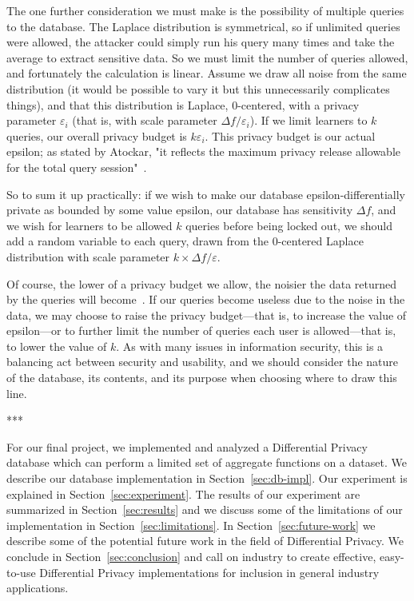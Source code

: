 \documentclass[conference,11pt]{IEEEtran}
\begin{document}
The one further consideration we must make is the possibility of multiple
queries to the database. The Laplace distribution is symmetrical, so if
unlimited queries were allowed, the attacker could simply run his query many
times and take the average to extract sensitive data. So we must limit the
number of queries allowed, and fortunately the calculation is linear. Assume we
draw all noise from the same distribution (it would be possible to vary it but
this unnecessarily complicates things), and that this distribution is Laplace,
0-centered, with a privacy parameter $\varepsilon_i$ (that is, with scale
parameter ${\Delta}f/\varepsilon_i$). If we limit learners to $k$ queries, our
overall privacy budget is $k\varepsilon_i$. This privacy budget is our
actual epsilon; as stated by Atockar, "it reflects the maximum privacy release
allowable for the total query session"~\cite{Atockar:2014}.

So to sum it up practically: if we wish to make our database
epsilon-differentially private as bounded by some value epsilon, our database
has sensitivity ${\Delta}f$, and we wish for learners to be allowed $k$ queries
before being locked out, we should add a random variable to each query, drawn
from the 0-centered Laplace distribution with scale parameter $k \times
{\Delta}f/\varepsilon$.

Of course, the lower of a privacy budget we allow, the noisier the data returned
by the queries will become~\cite{Atockar:2014}. If our queries become useless
due to the noise in the data, we may choose to raise the privacy budget---that
is, to increase the value of epsilon---or to further limit the number of queries
each user is allowed---that is, to lower the value of $k$. As with many issues
in information security, this is a balancing act between security and usability,
and we should consider the nature of the database, its contents, and its purpose
when choosing where to draw this line.

\begin{center}***\end{center}

For our final project, we implemented and analyzed a Differential Privacy
database which can perform a limited set of aggregate functions on a dataset.
We describe our database implementation in Section~\ref{sec:db-impl}. Our
experiment is explained in Section~\ref{sec:experiment}. The results of our
experiment are summarized in Section~\ref{sec:results} and we discuss some of
the limitations of our implementation in Section~\ref{sec:limitations}. In
Section~\ref{sec:future-work} we describe some of the potential future work in
the field of Differential Privacy. We conclude in Section~\ref{sec:conclusion}
and call on industry to create effective, easy-to-use Differential Privacy
implementations for inclusion in general industry applications.
\end{document}
